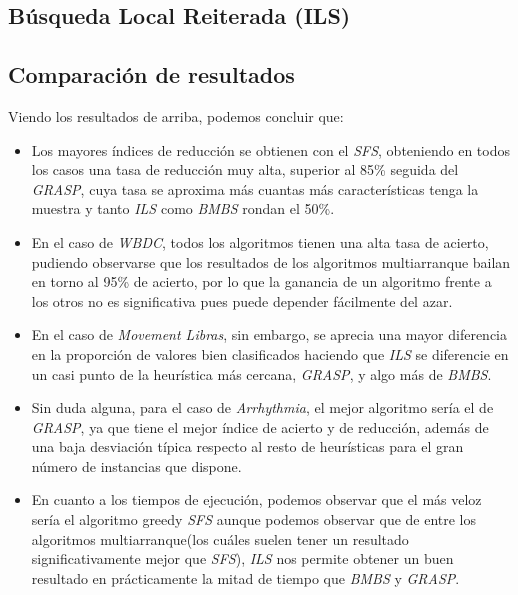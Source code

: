 \documentclass[a4paper, 11pt]{article}
\begin{document}
		\subsection{Búsqueda Local Reiterada (\textbf{ILS})}
			
			
			
			
		\subsection{Comparación de resultados}
			
			
			Viendo los resultados de arriba, podemos concluir que:
			\begin{itemize}
				\item Los mayores índices de reducción se obtienen con el \textit{SFS}, obteniendo en
				todos los casos una tasa de reducción muy alta, superior al 85\% seguida del \textit{GRASP},
				cuya tasa se aproxima más cuantas más características tenga la muestra y tanto \textit{ILS}
				como \textit{BMBS} rondan el 50\%.
				
				\item En el caso de \textit{WBDC}, todos los algoritmos tienen una alta tasa de acierto,
				pudiendo observarse que los resultados de los algoritmos multiarranque bailan en torno
				al 95\% de acierto, por lo que la ganancia de un algoritmo frente a los otros no es
				significativa pues puede depender fácilmente del azar.
				
				\item En el caso de \textit{Movement Libras}, sin embargo, se aprecia una mayor diferencia
				en la proporción de valores bien clasificados haciendo que \textit{ILS} se diferencie
				en un casi punto de la heurística más cercana, \textit{GRASP}, y algo más de \textit{BMBS}.
				
				\item Sin duda alguna, para el caso de \textit{Arrhythmia}, el mejor algoritmo sería
				el de \textit{GRASP}, ya que tiene el mejor índice de acierto y de reducción, además de
				una baja desviación típica respecto al resto de heurísticas para el gran número de
				instancias que dispone.
				
				\item En cuanto a los tiempos de ejecución, podemos observar que el más veloz sería el
				algoritmo greedy \textit{SFS} aunque podemos observar que de entre los algoritmos
				multiarranque(los cuáles suelen tener un resultado significativamente mejor que \textit{SFS}),
				\textit{ILS} nos permite obtener un buen resultado en prácticamente la mitad de tiempo
				que \textit{BMBS} y \textit{GRASP}.
			\end{itemize}
			
\end{document}
